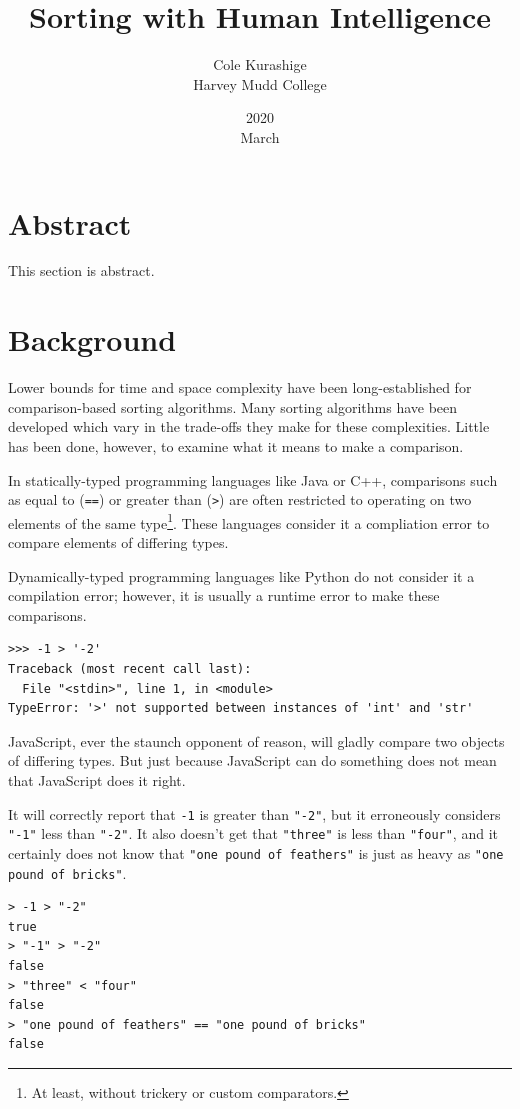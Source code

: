 \documentclass{article}
\title{Sorting with Human Intelligence}
\author{Cole Kurashige \\ Harvey Mudd College}
\date{2020 \\ March}
\begin{document}
\maketitle 

\section{Abstract}
This section is abstract.

\section{Background}
Lower bounds for time and space complexity have been long-established for
comparison-based sorting algorithms. Many sorting algorithms have been developed
which vary in the trade-offs they make for these complexities. Little has been
done, however, to examine what it means to make a comparison.

In statically-typed programming languages like Java or C++, comparisons such as
equal to (\texttt{==}) or greater than (\texttt{>}) are often restricted to
operating on two elements of the same type\footnote{At least, without trickery
  or custom comparators.}. These languages consider it a compliation error
to compare elements of differing types.

Dynamically-typed programming languages like Python do not consider it a
compilation error; however, it is usually a runtime error to make these
comparisons.

\begin{lstlisting}[caption = Comparisons in Python 3.7.6]
>>> -1 > '-2'
Traceback (most recent call last):
  File "<stdin>", line 1, in <module>
TypeError: '>' not supported between instances of 'int' and 'str'
\end{lstlisting}

JavaScript, ever the staunch opponent of reason, will gladly compare two objects
of differing types. But just because JavaScript can do something does not mean
that JavaScript does it right.

It will correctly report that \texttt{-1} is greater than \texttt{"-2"}, but it
erroneously considers \texttt{"-1"} less than \texttt{"-2"}. It also doesn't get
that \texttt{"three"} is less than \texttt{"four"}, and it certainly does not
know that \texttt{"one pound of feathers"} is just as heavy as \texttt{"one
  pound of bricks"}.

\begin{lstlisting}[caption = Comparisons in JavaScript (Node.js 12.12.0)]
> -1 > "-2"
true
> "-1" > "-2"
false
> "three" < "four"
false
> "one pound of feathers" == "one pound of bricks"
false
\end{lstlisting}
\end{document}
